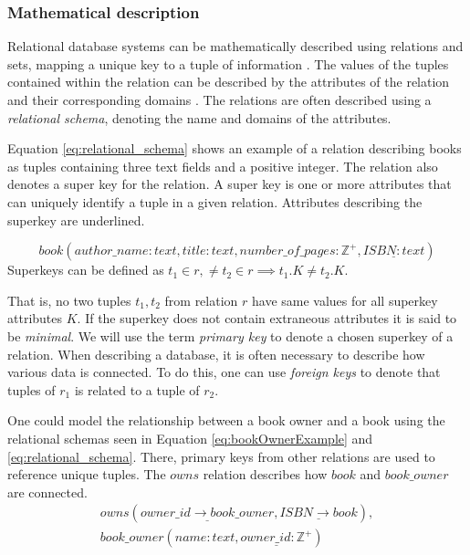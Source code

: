 \subsubsection*{Mathematical description}
Relational database systems can be mathematically described using relations and sets, mapping a unique key to a tuple of information \cite[Chapter~2.3]{DBSBook}.
The values of the tuples contained within the relation can be described by the attributes of the relation and their corresponding domains \cite{KatjaFirstPP}. 
The relations are often described using a \textit{relational schema}, denoting the name and domains of the attributes.

Equation \ref{eq:relational_schema} shows an example of a relation describing books as tuples containing three text fields and a positive integer.
The relation also denotes a super key for the relation. A super key is one or more attributes that can uniquely identify a tuple in a given relation. Attributes describing the superkey are underlined.

\begin{equation} \label{eq:relational_schema}
    book(author\_name:text, title: text, number\_of\_pages:\mathbb{Z}^+, \underline{ISBN: text})
\end{equation}
Superkeys can be defined as $t_1 \in r,\neq t_2 \in r \implies t_1.K \neq t_2.K$. 

That is, no two tuples $t_1, t_2$ from relation $r$ have same values for all superkey attributes $K$. 
If the superkey does not contain extraneous attributes it is said to be \textit{minimal}. \cite[Chapter 2.3]{DBSBook}
We will use the term \textit{primary key} to denote a chosen superkey of a relation. 
When describing a database, it is often necessary to describe how various data is connected. 
To do this, one can use \textit{foreign keys} to denote that tuples of $r_1$ is related to a tuple of $r_2$.


One could model the relationship between a book owner and a book using the relational schemas seen in Equation \ref{eq:bookOwnerExample} and \ref{eq:relational_schema}.
There, primary keys from other relations are used to reference unique tuples. The $owns$ relation describes how $book$ and $book\_owner$ are connected. 
\begin{equation}\label{eq:bookOwnerExample}
    \begin{split}
        owns(\underline{owner\_id \rightarrow book\_owner}, \underline{ISBN \rightarrow book}), \\
        book\_owner(name:text,\underline{owner\_id:\mathbb{Z}^+})
    \end{split}
\end{equation}

